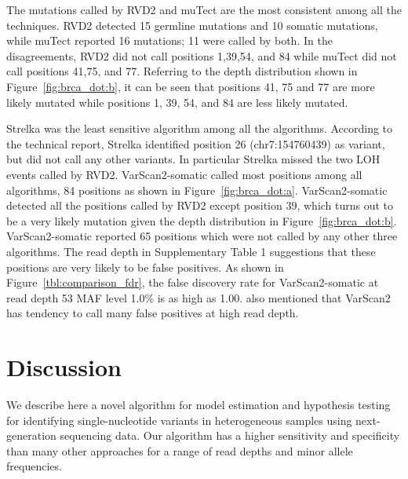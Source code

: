 \documentclass{bioinfo}
\begin{document}
The mutations called by RVD2 and muTect are the most consistent among all the techniques. 
RVD2 detected 15 germline mutations and 10 somatic mutations, while muTect reported 16 mutations; 11 were called by both. 
In the disagreements, RVD2 did not call positions 1,39,54, and 84 while muTect did not call positions 41,75, and 77. 
Referring to the depth distribution shown in Figure~\ref{fig:brca_dot:b}, it can be seen that positions 41, 75 and 77 are more likely mutated while positions 1, 39, 54, and 84 are less likely mutated. 

Strelka was the least sensitive algorithm among all the algorithms. According to the technical report, Strelka identified position 26 (chr7:154760439) as variant, but did not call any other variants. 
In particular Strelka missed the two LOH events called by RVD2. 
VarScan2-somatic called most positions among all algorithms, 84 positions as shown in Figure~\ref{fig:brca_dot:a}. 
VarScan2-somatic  detected all the positions called by RVD2 except position 39, which turns out to be a very likely mutation given the depth distribution in Figure~\ref{fig:brca_dot:b}. 
VarScan2-somatic reported 65 positions which were not called by any other three algorithms. 
The read depth in Supplementary Table 1 suggestions that these positions are very likely to be false positives. 
As shown in Figure~\ref{tbl:comparison_fdr}, the false discovery rate for VarScan2-somatic at read depth 53 MAF level 1.0\% is as high as 1.00.  \citet{spencer2013performance} also mentioned that VarScan2 has tendency to call many false positives at high read depth. 

\vspace{-5pt}
\section{Discussion}
We describe here a novel algorithm for model estimation and hypothesis testing for identifying single-nucleotide variants in heterogeneous samples using next-generation sequencing data. Our algorithm has a higher sensitivity and specificity than many other approaches for a range of read depths and minor allele frequencies.
\end{document}
